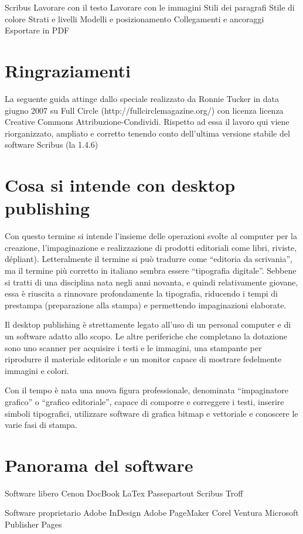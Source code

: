 \documentclass[a4paper, 12pt]{book}
\begin{document}
Scribus
Lavorare con il testo
Lavorare con le immagini
Stili dei paragrafi
Stile di colore
Strati e livelli
Modelli e posizionamento
Collegamenti e ancoraggi
Esportare in PDF

\section{Ringraziamenti}
La seguente guida attinge dallo speciale realizzato da Ronnie Tucker in data giugno 2007 su Full Circle (http://fullcirclemagazine.org/) con licenza  licenza Creative Commons Attribuzione-Condividi. Rispetto ad essa il lavoro qui viene riorganizzato, ampliato  e corretto tenendo conto dell'ultima versione stabile del software Scribus (la 1.4.6)

\section{Cosa si intende con desktop publishing}
Con questo termine si intende l'insieme delle operazioni svolte al computer per la creazione, l'impaginazione e realizzazione di prodotti editoriali come libri, riviste, dépliant). Letteralmente il termine si può tradurre come “editoria da scrivania”, ma il termine più corretto in italiano sembra essere “tipografia digitale”. Sebbene si tratti di una disciplina nata negli anni novanta, e quindi relativamente giovane, essa è riuscita a rinnovare profondamente la tipografia, riducendo i tempi di prestampa (preparazione alla stampa) e permettendo impaginazioni elaborate.

Il desktop publishing è strettamente legato all'uso di un personal computer e di un software adatto allo scopo. Le altre periferiche che completano la dotazione sono uno scanner per acquisire i testi e le immagini, una stampante per riprodurre il materiale editoriale e un monitor capace di mostrare fedelmente immagini e colori.

Con il tempo è nata una nuova figura professionale, denominata “impaginatore grafico” o “grafico editoriale”, capace di comporre e correggere i testi, inserire simboli tipografici, utilizzare software di grafica bitmap e vettoriale e conoscere le varie fasi di stampa.

\section{Panorama del software}
Software libero
Cenon
DocBook
LaTex
Passepartout
Scribus
Troff

Software proprietario
Adobe InDesign
Adobe PageMaker
Corel Ventura
Microsoft Publisher
Pages
\end{document}
